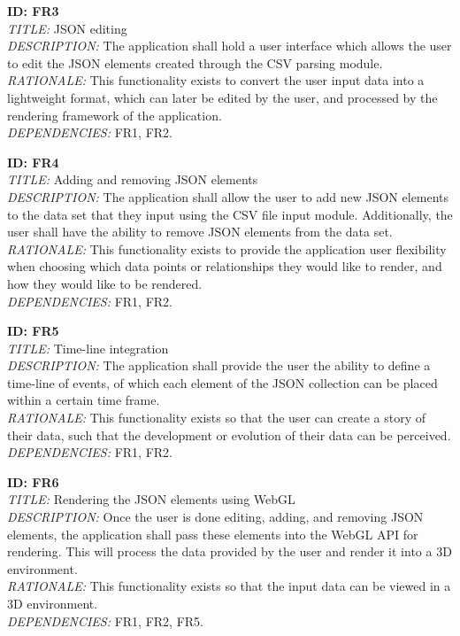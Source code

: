 \documentclass[journal,10pt,onecolumn,compsoc]{IEEEtran} \usepackage[margin=1.0in]{geometry} \usepackage{pdfpages}
\begin{document}
        \noindent \textbf{ID: FR3}\\
        \textit{TITLE:} JSON editing\\
        \textit{DESCRIPTION:} The application shall hold a user interface which allows the user to edit the JSON elements created through the CSV parsing module. \\
        \textit{RATIONALE:} This functionality exists to convert the user input data into a lightweight format, which can later be edited by the user, and processed by the rendering framework of the application. \\
        \textit{DEPENDENCIES:} FR1, FR2.
        \newline
        
        \noindent \textbf{ID: FR4}\\
        \textit{TITLE:} Adding and removing JSON elements\\
        \textit{DESCRIPTION:} The application shall allow the user to add new JSON elements to the data set that they input using the CSV file input module. Additionally, the user shall have the ability to remove JSON elements from the data set.\\
        \textit{RATIONALE:} This functionality exists to provide the application user flexibility when choosing which data points or relationships they would like to render, and how they would like to be rendered.\\
        \textit{DEPENDENCIES:} FR1, FR2.
        \newline
        
        \noindent \textbf{ID: FR5}\\
        \textit{TITLE:} Time-line integration\\
        \textit{DESCRIPTION:} The application shall provide the user the ability to define a time-line of events, of which each element of the JSON collection can be placed within a certain time frame. \\
        \textit{RATIONALE:} This functionality exists so that the user can create a story of their data, such that the development or evolution of their data can be perceived.\\
        \textit{DEPENDENCIES:} FR1, FR2.
        \newline
        
        \noindent \textbf{ID: FR6}\\
        \textit{TITLE:} Rendering the JSON elements using WebGL\\
        \textit{DESCRIPTION:} Once the user is done editing, adding, and removing JSON elements, the application shall pass these elements into the WebGL API for rendering. This will process the data provided by the user and render it into a 3D environment. \\
        \textit{RATIONALE:} This functionality exists so that the input data can be viewed in a 3D environment. \\
        \textit{DEPENDENCIES:} FR1, FR2, FR5. 
        \newpage
        
\end{document}

